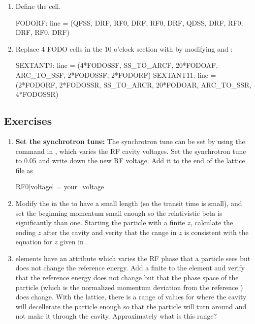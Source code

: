 \documentclass{hitec}     %
\begin{document}
{\begin{enumerate}[leftmargin=*]
    \item Define the  cell.
    \begin{code}
FODORF: line = (QFSS, DRF, RF0, DRF, RF0, DRF, QDSS, DRF, RF0, DRF, RF0, DRF)
    \end{code}
    
    \item Replace 4 FODO cells in the 10 o'clock section with  by modifying  and :
    \begin{code}
SEXTANT9:  line = (4*FODOSSF, SS_TO_ARCF, 20*FODOAF, 
                              ARC_TO_SSF, 2*FODOSSF, 2*FODORF)
SEXTANT11: line = (2*FODORF, 2*FODOSSR, SS_TO_ARCR, 
                        20*FODOAR, ARC_TO_SSR, 4*FODOSSR)
    \end{code}
\end{enumerate}

\subsection{Exercises}

\begin{enumerate}[leftmargin=*]
%
\item {\bf Set the synchrotron tune:} The synchrotron tune can be set by using the  command in \tao, which varies the RF cavity voltages. Set the synchrotron tune to 0.05 and write down the new RF voltage. Add it to the end of the lattice file as
\begin{code}
RF0[voltage] = your_voltage
\end{code}
%
\item 
Modify the  in the  to have a small length (so the transit time is
small), and set the beginning momentum small enough so the relativistic beta is significantly than
one. Starting the particle with a finite $z$, calculate the ending $z$ after the cavity and verity
that the cange in $z$ is consistent with the equation for $z$ given in .
%
\item
{} elements have an attribute  which varies the RF phase that a particle sees
but does not change the reference energy. Add a finite  to the  element and
verify that the reference energy does not change but that the phase space  of the particle
(which is the normalized momentum deviation from the reference ) does
change. With the  lattice, there is a range of values for  where the
cavity will decellerate the particle enough so that the particle will turn around and not make
it through the cavity. Approximately what is this range?
%
\end{enumerate}

}
\end{document}

